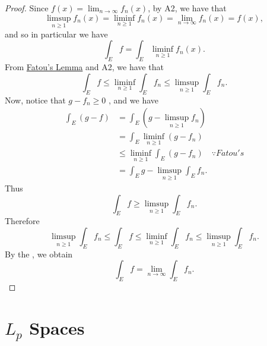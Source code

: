 \documentclass[notoc,notitlepage]{tufte-book}
\begin{document}
\begin{proof}
  \noindent
  Since $f(x) = \lim_{n \to \infty} f_n(x)$, by A2, we have that
  \begin{equation*}
    \limsup_{n \geq 1} f_n (x) = \liminf_{n \geq 1} f_n(x) = \lim_{n \to \infty}
    f_n(x) = f(x),
  \end{equation*}
  and so in particular we have
  \begin{equation*}
    \int_{E} f = \int_{E} \liminf_{n \geq 1} f_n(x).
  \end{equation*}
  From \hyperref[thm:fatou_s_lemma]{Fatou's Lemma} and A2, we have that
  \begin{equation*}
    \int_{E} f \leq \liminf_{n \geq 1} \int_{E} f_n \leq \limsup_{n \geq 1}
    \int_{E} f_n.
  \end{equation*}
  Now, notice that $g - f_n \geq 0$ , and we have
  \begin{align*}
    \int_E (g - f) &= \int_{E} (g - \limsup_{n \geq 1} f_n) \\
                   &= \int_E \liminf_{n \geq 1} (g - f_n) \\
                   &\leq \liminf_{n \geq 1} \int_{E} (g - f_n) \quad \because
                   \hyperref[thm:fatou_s_lemma]{Fatou's} \\
                   &= \int_{E} g - \limsup_{n \geq 1} \int_{E} f_n.
  \end{align*}
  Thus
  \begin{equation*}
    \int_{E} f \geq \limsup_{n \geq 1} \int_{E} f_n.
  \end{equation*}
  Therefore
  \begin{equation*}
    \limsup_{n \geq 1} \int_{E} f_n \leq \int_{E} f \leq \liminf_{n \geq 1}
    \int_{E} f_n \leq \limsup_{n \geq 1} \int_{E} f_n.
  \end{equation*}
  By the , we obtain
  \begin{equation*}
    \int_{E} f = \lim_{n \to \infty} \int_{E} f_n.
  \end{equation*}
\end{proof}


\section{\texorpdfstring{$L_p$}{Lp} Spaces}%
\label{sec:_l_p_spaces}
\end{document}
